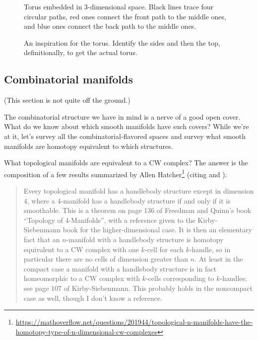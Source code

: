 \begin{figure}[h]
\centering

\caption{Torus embedded in 3-dimensional space. Black lines trace four circular paths, red ones connect the front path to the middle ones, and blue ones connect the back path to the middle ones.}
\label{fig:torus}
\end{figure}

\begin{figure}[h]
\centering

\caption{An inspiration for the torus. Identify the sides and then the top, definitionally, to get the actual torus.}
\label{fig:flattorus}
\end{figure}


\subsection{Combinatorial manifolds}

(This section is not quite off the ground.)

The combinatorial structure we have in mind is a nerve of a good open cover. What do we know about which smooth manifolds have such covers? While we're at it, let's survey all the combinatorial-flavored spaces and survey what smooth manifolds are homotopy equivalent to which structures.

What topological manifolds are equivalent to a CW complex? The answer is the composition of a few results summarized by Allen Hatcher\footnote{\url{https://mathoverflow.net/questions/201944/topological-n-manifolds-have-the-homotopy-type-of-n-dimensional-cw-complexes}} (citing \cite{kirby_siebenmann} and \cite{freedman_quinn}):

\begin{quote}
Every topological manifold has a handlebody structure except in dimension 4, where a 4-manifold has a handlebody structure if and only if it is smoothable. This is a theorem on page 136 of Freedman and Quinn's book ``Topology of 4-Manifolds'', with a reference given to the Kirby-Siebenmann book for the higher-dimensional case. It is then an elementary fact that an \( n \)-manifold with a handlebody structure is homotopy equivalent to a CW complex with one \( k \)-cell for each \( k \)-handle, so in particular there are no cells of dimension greater than \( n \). At least in the compact case a manifold with a handlebody structure is in fact homeomorphic to a CW complex with \( k \)-cells corresponding to \( k \)-handles; see page 107 of Kirby-Siebenmann. This probably holds in the noncompact case as well, though I don't know a reference.
\end{quote}


